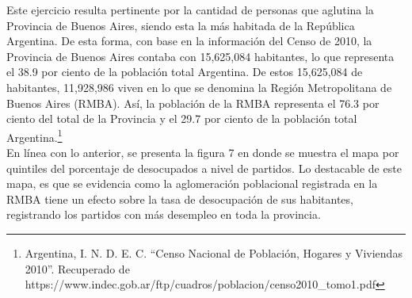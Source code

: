 \documentclass[12pt]{article} %
\begin{document}
Este ejercicio resulta pertinente por la cantidad de personas que aglutina la Provincia de Buenos Aires, siendo esta la más habitada de la República Argentina. De esta forma, con base en la información del Censo de 2010, la Provincia de Buenos Aires contaba con 15,625,084 habitantes, lo que representa el 38.9 por ciento de la población total Argentina. De estos 15,625,084 de habitantes, 11,928,986 viven en lo que se denomina la Región Metropolitana de Buenos Aires (RMBA). Así, la población de la RMBA representa el 76.3 por ciento del total de la Provincia y el 29.7 por ciento de la población total Argentina.\footnote{Argentina, I. N. D. E. C. ``Censo Nacional de Población, Hogares y Viviendas 2010''. Recuperado de https://www.indec.gob.ar/ftp/cuadros/poblacion/censo2010\_tomo1.pdf}\\

En línea con lo anterior, se presenta la figura 7 en donde se muestra el mapa por quintiles del porcentaje de desocupados a nivel de partidos. Lo destacable de este mapa, es que se evidencia como la aglomeración poblacional registrada en la RMBA tiene un efecto sobre la tasa de desocupación de sus habitantes, registrando los partidos con más desempleo en toda la provincia.\\
\end{document}

